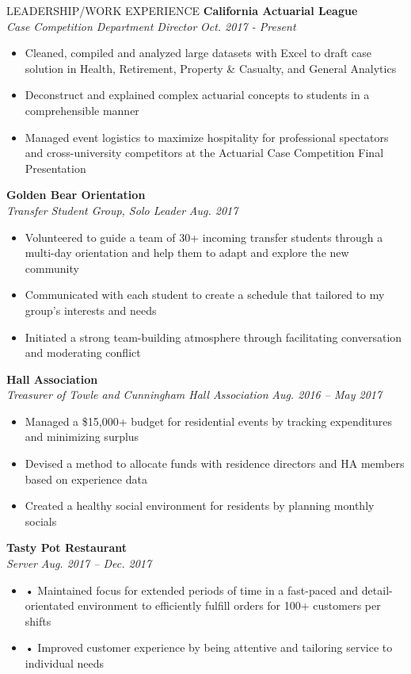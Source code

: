\documentclass{resume} %
\begin{document}
\begin{rSection}{LEADERSHIP/WORK EXPERIENCE}
{\bf California Actuarial League}
\\{\em Case Competition Department Director} \hfill {\em Oct. 2017 - Present} 
\begin{itemize}
    \item Cleaned, compiled and analyzed large datasets with Excel to draft case solution in Health, Retirement, Property \& Casualty, and General Analytics
    \item Deconstruct and explained complex actuarial concepts to students in a comprehensible manner
    \item Managed event logistics to maximize hospitality for professional spectators and cross-university competitors at the Actuarial Case Competition Final Presentation 
\end{itemize}

{\bf Golden Bear Orientation }
\\{\em Transfer Student Group, Solo Leader} \hfill {\em Aug. 2017} 
\begin{itemize}
    \item Volunteered to guide a team of 30+ incoming transfer students through a multi-day orientation and help them to adapt and explore the new community
    \item Communicated with each student to create a schedule that tailored to my group’s interests and needs
    \item Initiated a strong team-building atmosphere through facilitating conversation and moderating conflict
\end{itemize}

{\bf Hall Association  }
\\{\em Treasurer of Towle and Cunningham Hall Association} \hfill {\em Aug. 2016 – May 2017} 
\begin{itemize}
    \item Managed a \$15,000+ budget for residential events by tracking expenditures and minimizing surplus
    \item Devised a method to allocate funds with residence directors and HA members based on experience data
    \item Created a healthy social environment for residents by planning monthly socials
\end{itemize}

{\bf Tasty Pot Restaurant }
\\{\em Server } \hfill {\em Aug. 2017 – Dec. 2017} 
\begin{itemize}
    \item •	Maintained focus for extended periods of time in a fast-paced and detail-orientated environment to efficiently fulfill orders for 100+ customers per shifts
    \item •	Improved customer experience by being attentive and tailoring service to individual needs
\end{itemize}
\end{rSection}
\end{document}

